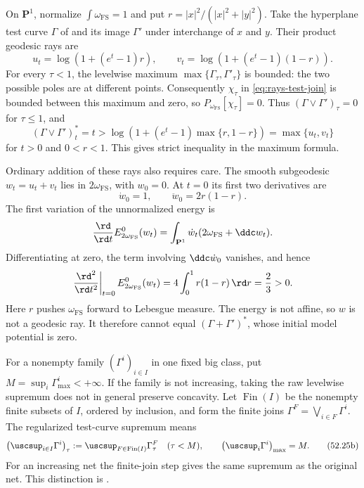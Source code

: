 \begin{example}\label{ex:rays-operation-projection}
On $\mathbf P^1$, normalize $\int\omega_{\mathrm{FS}}=1$ and put
$r=|x|^2/(|x|^2+|y|^2)$.
Take the hyperplane test curve $\Gamma$ of
 and its image $\Gamma'$
under interchange of $x$ and $y$.
Their product geodesic rays are
\[
 u_t=\log(1+(e^t-1)r),\qquad
 v_t=\log(1+(e^t-1)(1-r)).
\]
For every $\tau<1$, the levelwise maximum
$\max\{\Gamma_\tau,\Gamma'_\tau\}$ is bounded: the two possible
poles are at different points.
Consequently $\chi_\tau$ in \eqref{eq:rays-test-join} is bounded
between this maximum and zero, so $P_{\omega_{\mathrm{FS}}}[\chi_\tau]=0$.
Thus $(\Gamma\vee\Gamma')_\tau=0$ for $\tau\leq1$, and
\[
 (\Gamma\vee\Gamma')_t^*=t
 >\log(1+(e^t-1)\max\{r,1-r\})
 =\max\{u_t,v_t\}
\]
for $t>0$ and $0<r<1$.
This gives strict inequality in the maximum formula.

Ordinary addition of these rays also requires care.
The smooth subgeodesic $w_t=u_t+v_t$ lies in
$2\omega_{\mathrm{FS}}$, with $w_0=0$.
At $t=0$ its first two derivatives are
\[
                   \dot w_0=1,\qquad
                   \ddot w_0=2r(1-r).
\]
The first variation of the unnormalized energy is
\[
 \frac{\rd}{\rd t}E_{2\omega_{\mathrm{FS}}}^0(w_t)
 =\int_{\mathbf P^1}\dot w_t(2\omega_{\mathrm{FS}}+\ddc w_t).
\]
Differentiating at zero, the term involving
$\ddc\dot w_0$ vanishes, and hence
\[
 \left.\frac{\rd^2}{\rd t^2}\right|_{t=0}
 E_{2\omega_{\mathrm{FS}}}^0(w_t)
 =4\int_0^1r(1-r)\,\rd r=\frac23>0.
\]
Here $r$ pushes $\omega_{\mathrm{FS}}$ forward to Lebesgue measure.
The energy is not affine, so $w$ is not a geodesic ray.
It therefore cannot equal $(\Gamma+\Gamma')^*$, whose initial
model potential is zero.
\end{example}

For a nonempty family $(\Gamma^i)_{i\in I}$ in one fixed big class,
put $M=\sup_i\Gamma^i_{\max}<+\infty$.
If the family is not increasing, taking the raw levelwise supremum
does not in general preserve concavity.
Let $\operatorname{Fin}(I)$ be the nonempty finite subsets of $I$,
ordered by inclusion, and form the finite joins
$\Gamma^F=\bigvee_{i\in F}\Gamma^i$.
The regularized test-curve supremum means
\[
 \left(\uscsup_{i\in I}\Gamma^i\right)_\tau
 :=\uscsup_{F\in\operatorname{Fin}(I)}\Gamma^F_\tau
 \quad(\tau<M),\qquad
 \left(\uscsup_i\Gamma^i\right)_{\max}=M.
\tag{52.25b}\label{eq:rays-directed-supremum}
\]
For an increasing net the finite-join step gives the same supremum
as the original net.
This distinction is \cite[Definitions~9.4.5--9.4.6]{XiaBook}.


